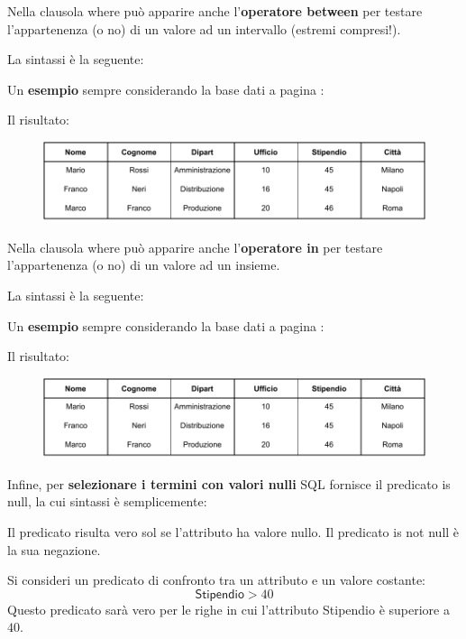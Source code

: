 \documentclass[a4paper]{article}
\begin{document}
	\noindent
	Nella clausola \textsf{where} può apparire anche l'\textbf{operatore \textsf{between}} per testare l'appartenenza (o no) di un valore ad un intervallo (estremi compresi!).\newline
	
	\noindent
	La sintassi è la seguente:
	
	Un \textcolor{Green4}{\textbf{esempio}} sempre considerando la base dati a pagina \pageref{select dbms}:
	
	Il risultato:
	\begin{figure}[!htp]
		\centering
		\includegraphics[width=\textwidth]{img/between-ex1.pdf}
	\end{figure}\:\newline

	\noindent
	Nella clausola \textsf{where} può apparire anche l'\textbf{operatore \textsf{in}} per testare l'appartenenza (o no) di un valore ad un insieme.\newline
	
	\noindent
	La sintassi è la seguente:
	
	Un \textcolor{Green4}{\textbf{esempio}} sempre considerando la base dati a pagina \pageref{select dbms}:
	
	Il risultato:
	\begin{figure}[!htp]
		\centering
		\includegraphics[width=\textwidth]{img/in-ex1.pdf}
	\end{figure}\newpage

	\noindent
	Infine, per \textbf{selezionare i termini con valori nulli} SQL fornisce il predicato \textsf{is null}, la cui sintassi è semplicemente:
	
	Il predicato risulta vero sol se l'attributo ha valore nullo. Il predicato \textsf{is not null} è la sua negazione.\newline
	
	\noindent
	Si consideri un predicato di confronto tra un attributo e un valore costante:
	\begin{equation*}
		\textsf{Stipendio} > 40
	\end{equation*}
	Questo predicato sarà vero per le righe in cui l'attributo \textsf{Stipendio} è superiore a	$40$.
	
\end{document}
